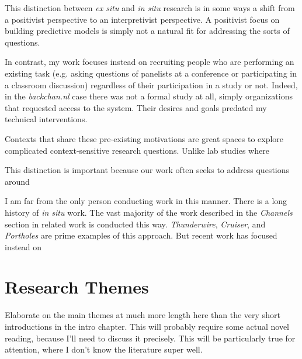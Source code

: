 
This distinction between \emph{ex situ} and \emph{in situ} research is in some ways a shift from a positivist perspective to an interpretivist perspective. A positivist focus on building predictive models is simply not a natural fit for addressing the sorts of questions.



In contrast, my work focuses instead on recruiting people who are performing an existing task (e.g. asking questions of panelists at a conference or participating in a classroom discussion) regardless of their participation in a study or not. Indeed, in the \emph{backchan.nl} case there was not a formal study at all, simply organizations that requested access to the system. Their desires and goals predated my technical interventions.


Contexts that share these pre-existing motivations are great spaces to explore complicated context-sensitive research questions. Unlike lab studies where 

This distinction is important because our work often seeks to address questions around 




I am far from the only person conducting work in this manner. There is a long history of \emph{in situ} work. The vast majority of the work described in the \emph{Channels} section in related work is conducted this way. \emph{Thunderwire}, \emph{Cruiser}, and \emph{Portholes} are prime examples of this approach. But recent work has focused instead on 


\section{Research Themes}

Elaborate on the main themes at much more length here than the very short introductions in the intro chapter. This will probably require some actual novel reading, because I'll need to discuss it precisely. This will be particularly true for attention, where I don't know the literature super well.


